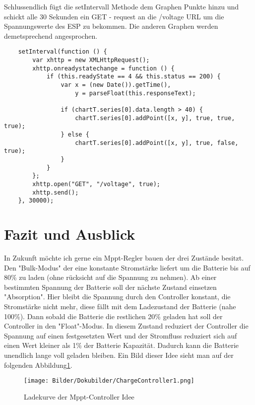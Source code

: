 \documentclass[ngerman]{mucproc}
\newenvironment{minted}[2][]{\endgraf\verbatim}{\endverbatim}
\begin{document}
Schlussendlich fügt die setIntervall Methode dem Graphen Punkte hinzu und schickt alle 30 Sekunden ein GET - request an die /voltage URL um die Spannungswerte des ESP zu bekommen. Die anderen Graphen werden demetsprechend angesprochen.

\begin{verbatim}
	setInterval(function () {
        var xhttp = new XMLHttpRequest();
        xhttp.onreadystatechange = function () {
            if (this.readyState == 4 && this.status == 200) {
                var x = (new Date()).getTime(),
                    y = parseFloat(this.responseText);
               
                if (chartT.series[0].data.length > 40) {
                    chartT.series[0].addPoint([x, y], true, true, true);
                } else {
                    chartT.series[0].addPoint([x, y], true, false, true);
                }
            }
        };
        xhttp.open("GET", "/voltage", true);
        xhttp.send();
    }, 30000);
\end{verbatim}


\section{Fazit und Ausblick}
In Zukunft möchte ich gerne ein Mppt-Regler bauen der drei Zustände besitzt\parencite{Electronoobs.2020}. Den "Bulk-Modus" der eine konstante Stromstärke liefert um die Batterie bis auf 80\% zu laden (ohne rücksicht auf die Spannung zu nehmen). Ab einer bestimmten Spannung der Batterie soll der nächste Zustand einsetzen "Absorption". Hier bleibt die Spannung durch den Controller konstant, die Stromstärke nicht mehr, diese fällt mit dem Ladezustand der Batterie (nahe 100\%). Dann sobald die Batterie die restlichen 20\% geladen hat soll der Controller in den "Float"-Modus. In diesem Zustand reduziert der Controller die Spannung auf einen festgesetzten Wert und der Stromfluss reduziert sich auf einen Wert kleiner als 1\% der Batterie Kapazität. Dadurch kann die Batterie unendlich lange voll geladen bleiben. Ein Bild dieser Idee sieht man auf der folgenden Abbildung\ref{fig:MPPT Solar Charger Prototype}.

\begin{figure}
			\centering
			\texttt{[image: Bilder/Dokubilder/ChargeController1.png]}
			\caption{Ladekurve der Mppt-Controller Idee}
			\label{fig:MPPT Solar Charger Prototype}
		\end{figure}
\end{document}
